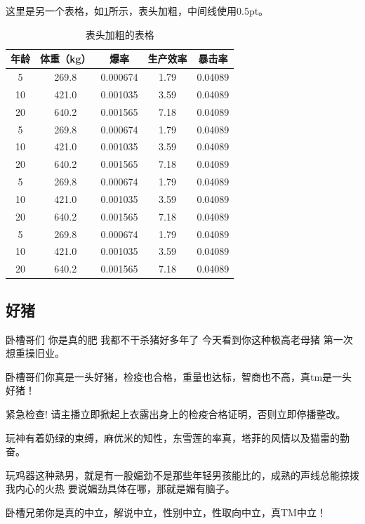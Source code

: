 这里是另一个表格，如\ref{tab:table2}所示，表头加粗，中间线使用0.5pt。

\begin{table}[htbp]
\caption{表头加粗的表格}\label{tab:table2}
\vspace{0.5em}\centering\wuhao
\begin{tabular}{ccccc}
\toprule[1.5pt]
\textbf{年龄} & \textbf{ 体重（kg）} & \textbf{ 爆率} & \textbf{ 生产效率} & \textbf{暴击率 }\\
\midrule[0.5pt]
 5 & 269.8 & 0.000674 & 1.79 & 0.04089\\
10 & 421.0 & 0.001035 & 3.59 & 0.04089\\
20 & 640.2 & 0.001565 & 7.18 & 0.04089\\
 5 & 269.8 & 0.000674 & 1.79 & 0.04089\\
10 & 421.0 & 0.001035 & 3.59 & 0.04089\\
20 & 640.2 & 0.001565 & 7.18 & 0.04089\\
 5 & 269.8 & 0.000674 & 1.79 & 0.04089\\
10 & 421.0 & 0.001035 & 3.59 & 0.04089\\
20 & 640.2 & 0.001565 & 7.18 & 0.04089\\
 5 & 269.8 & 0.000674 & 1.79 & 0.04089\\
10 & 421.0 & 0.001035 & 3.59 & 0.04089\\
20 & 640.2 & 0.001565 & 7.18 & 0.04089\\
\bottomrule[1.5pt]
\end{tabular}
\vspace{\baselineskip}
\end{table}

\subsection{好猪}

卧槽哥们 你是真的肥 我都不干杀猪好多年了 今天看到你这种极高老母猪 第一次想重操旧业。

卧槽哥们你真是一头好猪，检疫也合格，重量也达标，智商也不高，真tm是一头好猪！

紧急检查! 请主播立即掀起上衣露出身上的检疫合格证明，否则立即停播整改。

玩神有着奶绿的束缚，麻优米的知性，东雪莲的率真，塔菲的风情以及猫雷的勤奋。

玩鸡器这种熟男，就是有一股媚劲不是那些年轻男孩能比的，成熟的声线总能掠拨我内心的火热
要说媚劲具体在哪，那就是媚有脑子。

卧槽兄弟你是真的中立，解说中立，性别中立，性取向中立，真TM中立！

